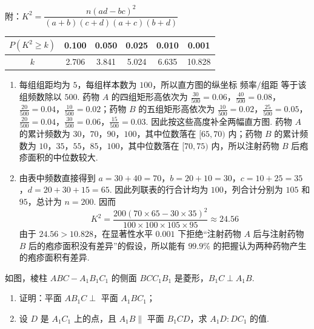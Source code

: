 \begin{problem}
附：\(K^2=\dfrac{n(ad-bc)^2}{(a+b)(c+d)(a+c)(b+d)}\)

\begin{center}
\begin{tabular}{|c|c|c|c|c|c|}
\hline
\(P(K^2\geqslant k)\) & 0.100 & 0.050 & 0.025 & 0.010 & 0.001 \\
\hline
\(k\) & 2.706 & 3.841 & 5.024 & 6.635 & 10.828 \\
\hline
\end{tabular}
\end{center}
\end{problem}

\begin{solution}
\begin{enumerate}
\item 每组组距均为 \(5\)，每组样本数为 \(100\)，所以直方图的纵坐标 \(\text{频率}/\text{组距}\) 等于该组频数除以 \(500\). 药物 \(A\) 的四组矩形高依次为 \(\frac{30}{500}=0.06\)，\(\frac{40}{500}=0.08\)，\(\frac{20}{500}=0.04\)，\(\frac{10}{500}=0.02\)；药物 \(B\) 的五组矩形高依次为 \(\frac{10}{500}=0.02\)，\(\frac{25}{500}=0.05\)，\(\frac{20}{500}=0.04\)，\(\frac{30}{500}=0.06\)，\(\frac{15}{500}=0.03\). 因此按这些高度补全两幅直方图. 药物 \(A\) 的累计频数为 \(30\)，\(70\)，\(90\)，\(100\)，其中位数落在 \([65,70)\) 内；药物 \(B\) 的累计频数为 \(10\)，\(35\)，\(55\)，\(85\)，\(100\)，其中位数落在 \([70,75)\) 内，所以注射药物 \(B\) 后疱疹面积的中位数较大.
\item 由表中频数直接得到 \(a=30+40=70\)，\(b=20+10=30\)，\(c=10+25=35\)，\(d=20+30+15=65\). 因此列联表的行合计均为 \(100\)，列合计分别为 \(105\) 和 \(95\)，总计为 \(n=200\). 因而
\[
K^2=\frac{200(70\times65-30\times35)^2}{100\times100\times105\times95}\approx24.56
\]
由于 \(24.56>10.828\)，在显著性水平 \(0.001\) 下拒绝“注射药物 \(A\) 后与注射药物 \(B\) 后的疱疹面积没有差异”的假设，所以能有 \(99.9\%\) 的把握认为两种药物产生的疱疹面积有差异.
\end{enumerate}
\end{solution}

\begin{problem}
如图，棱柱 \(ABC-A_1B_1C_1\) 的侧面 \(BCC_1B_1\) 是菱形，\(B_1C\perp A_1B\).

\begin{enumerate}
\item 证明：平面 \(AB_1C\perp\) 平面 \(A_1BC_1\)；
\item 设 \(D\) 是 \(A_1C_1\) 上的点，且 \(A_1B\parallel\) 平面 \(B_1CD\)，求 \(A_1D:DC_1\) 的值.
\end{enumerate}

\end{problem}

